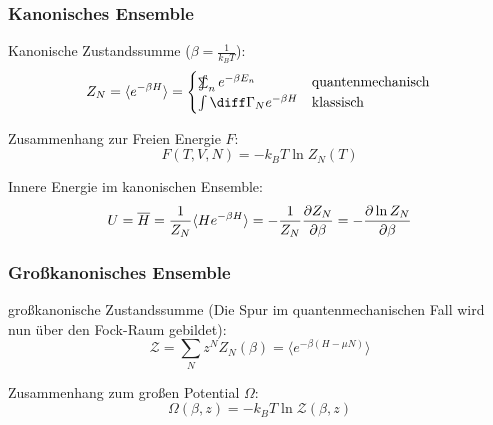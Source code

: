 \documentclass[11pt]{article}
\DeclareMathOperator*{\SumInt}{%
\mathchoice%
  {\ooalign{$\displaystyle\sum$\cr\hidewidth$\displaystyle\int$\hidewidth\cr}}
  {\ooalign{\raisebox{.14\height}{\scalebox{.7}{$\textstyle\sum$}}\cr\hidewidth$\textstyle\int$\hidewidth\cr}}
  {\ooalign{\raisebox{.2\height}{\scalebox{.6}{$\scriptstyle\sum$}}\cr$\scriptstyle\int$\cr}}
  {\ooalign{\raisebox{.2\height}{\scalebox{.6}{$\scriptstyle\sum$}}\cr$\scriptstyle\int$\cr}}
}
\numberwithin{equation}{section}
\begin{document}
        \subsubsection{Kanonisches Ensemble}
          Kanonische Zustandssumme ($\beta = \frac{1}{k_B T}$):
          \begin{equation}
            Z_N=\langle e^{-\beta H} \rangle
              = \begin{cases}
                  \SumInt_n e^{-\beta E_n} & \text{quantenmechanisch} \\
                  \int \diff \Gamma_N e^{-\beta H} & \text{klassisch}
                \end{cases} \\
          \end{equation}

          Zusammenhang zur Freien Energie $F$:
          \begin{equation}
            F(T, V, N) = -k_B T \ln{Z_N(T)}
          \end{equation}


          Innere Energie im kanonischen Ensemble:
          \begin{equation}
            U = \overline{H} = \frac{1}{Z_N}\langle He^{-\beta H}\rangle = -\frac{1}{Z_N}\frac{\partial Z_N}{\partial \beta} = -\frac{\partial \ln Z_N}{\partial \beta}
          \end{equation}

        \subsubsection{Großkanonisches Ensemble}
          großkanonische Zustandssumme (Die Spur im quantenmechanischen Fall wird nun über den Fock-Raum gebildet):
          \begin{equation}
            \mathcal{Z} = \sum_N z^N Z_N(\beta) = \langle e^{-\beta(H-\mu N)} \rangle
          \end{equation}

          Zusammenhang zum großen Potential $\Omega$:
          \begin{equation}
            \Omega(\beta,z) = -k_B T \ln \mathcal{Z}(\beta,z)
          \end{equation}
\end{document}
